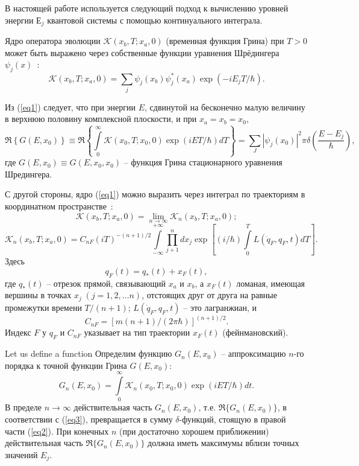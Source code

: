 \documentclass[11pt]{article}
\begin{document}
В настоящей работе используется следующий подход к вычислению уровней энергии $Е_j$ квантовой системы
с помощью континуального интеграла.

Ядро оператора эволюции $\mathcal{K}(x_{b},T;x_{a},0)$ (временная функция Грина) при $T>0$ может быть выражено через собственные функции уравнения Шрёдингера  $\psi_j(x)$~\cite{2}:
\begin{equation}
  \mathcal{K}(x_{b},T;x_{a},0)=\sum_j \psi_j(x_b)\psi_j^*(x_a)\exp(-iE_jT/\hbar).
\label{eq1}
\end{equation}

Из (\ref{eq1}) следует, что при энергии $E$, сдвинутой на бесконечно малую величину в верхнюю половину комплексной плоскости,
и при $x_a=x_b=x_0$,
\begin{equation}
  \Re\left\{
G(E,x_0)\right\}\equiv
\Re\left\{\int\limits_0^\infty\mathcal{K}(x_0,T;x_0,0)\exp(iET/\hbar)dT\right\}=
  \sum_J|\psi_j(x_0)|^2\pi\delta \left(\frac{E-E_j}{\hbar}\right),
\label{eq2}
\end{equation}
где $G(E,x_0)\equiv G(E,x_0,x_0)$ -- функция Грина стационарного уравнения Шредингера.

С другой стороны, ядро (\ref{eq1}) можно выразить через интеграл по траекториям в координатном пространстве~\cite{1, 2}:
\begin{equation}
\mathcal{K}(x_{b},T;x_{a},0)= \lim_{n\to\infty}\mathcal{K}_n(x_{b},T;x_{a},0) ;
\label{eq3}
\end{equation}
\begin{equation}
  \mathcal{K}_n(x_b,T;x_a,0)=C_{nF}(iT)^{-(n+1)/2} \int\limits_{-\infty}^{+\infty}\prod_{j+1}^n
  dx_j\exp[(i/\hbar)\int\limits_0^T L(\dot{q}_F,q_F,t)dT].
\label{4}
\end{equation}
Здесь
\begin{equation}
  q_F(t)=q_*(t)+x_F(t) ,
\label{eq5}
\end{equation}
где $q_*(t)$ -- отрезок прямой, связывающий $x_a$ и $x_b$, а
$x_F(t)$ ломаная, имеющая вершины в точках
$x_j \; (j=1,2,\ldots n)$, отстоящих друг от друга на равные промежутки времени $T/(n+1)$;
$L(\dot{q}_F,q_F,t)$ -- это лагранжиан, и
\begin{equation}
  C_{nF}=[m(n+1)/(2\pi\hbar)]^{(n+1)/2}.
\label{eq6}
\end{equation}
Индекс $F$ у $q_F$ и $C_{nF}$ указывает на тип траектории $x_F(t)$  (фейнмановский).

Let us define a function
Определим функцию $G_n(E,x_0)$ -- аппроксимацию  $n$-го порядка к
точной функции Грина $G(E,x_0)$:
\begin{equation}
  G_n(E,x_0)=\int\limits_0^\infty \mathcal{K}_n(x_0,T;x_0,0)\exp(iET/\hbar)dt.
\label{eq7}
\end{equation}
В пределе $n\to \infty $ действительная часть $G_n(E,x_0)$, т.е.
$\Re \{G_n(E,x_0)\}$, в соответствии с (\ref{eq3}), превращается в сумму
$\delta$-функций, стоящую в правой части (\ref{eq2}).
При конечных $n$ (при достаточно хорошем приближении)
действительная часть $\Re \{G_n(E,x_0)\}$ должна иметь максимумы вблизи точных значений $E_j$.
\end{document}
